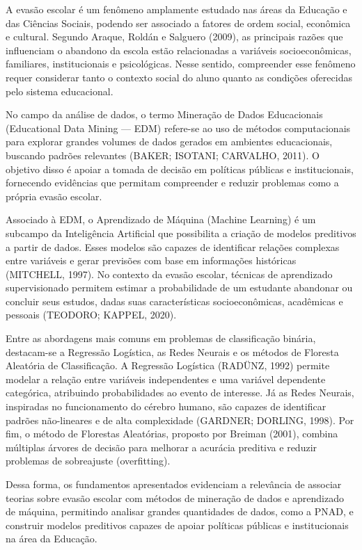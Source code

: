 \documentclass[english, spanish, brazilian]{RBIEarticle} %
\begin{document}
A evasão escolar é um fenômeno amplamente estudado nas áreas da Educação e das Ciências Sociais, podendo ser associado a fatores de ordem social, econômica e cultural. Segundo Araque, Roldán e Salguero (2009), as principais razões que influenciam o abandono da escola estão relacionadas a variáveis socioeconômicas, familiares, institucionais e psicológicas. Nesse sentido, compreender esse fenômeno requer considerar tanto o contexto social do aluno quanto as condições oferecidas pelo sistema educacional. 

No campo da análise de dados, o termo Mineração de Dados Educacionais (Educational Data Mining — EDM) refere-se ao uso de métodos computacionais para explorar grandes volumes de dados gerados em ambientes educacionais, buscando padrões relevantes (BAKER; ISOTANI; CARVALHO, 2011). O objetivo disso é apoiar a tomada de decisão em políticas públicas e institucionais, fornecendo evidências que permitam compreender e reduzir problemas como a própria evasão escolar.

Associado à EDM, o Aprendizado de Máquina (Machine Learning) é um subcampo da Inteligência Artificial que possibilita a criação de modelos preditivos a partir de dados. Esses modelos são capazes de identificar relações complexas entre variáveis e gerar previsões com base em informações históricas (MITCHELL, 1997). No contexto da evasão escolar, técnicas de aprendizado supervisionado permitem estimar a probabilidade de um estudante abandonar ou concluir seus estudos, dadas suas características socioeconômicas, acadêmicas e pessoais (TEODORO; KAPPEL, 2020).

Entre as abordagens mais comuns em problemas de classificação binária, destacam-se a Regressão Logística, as Redes Neurais e os métodos de Floresta Aleatória de Classificação. A Regressão Logística (RADÜNZ, 1992) permite modelar a relação entre variáveis independentes e uma variável dependente categórica, atribuindo probabilidades ao evento de interesse. Já as Redes Neurais, inspiradas no funcionamento do cérebro humano, são capazes de identificar padrões não-lineares e de alta complexidade (GARDNER; DORLING, 1998). Por fim, o método de Florestas Aleatórias, proposto por Breiman (2001), combina múltiplas árvores de decisão para melhorar a acurácia preditiva e reduzir problemas de sobreajuste (overfitting).

Dessa forma, os fundamentos apresentados evidenciam a relevância de associar teorias sobre evasão escolar com métodos de mineração de dados e aprendizado de máquina, permitindo analisar grandes quantidades de dados, como a PNAD, e construir modelos preditivos capazes de apoiar políticas públicas e institucionais na área da Educação.
\end{document}
